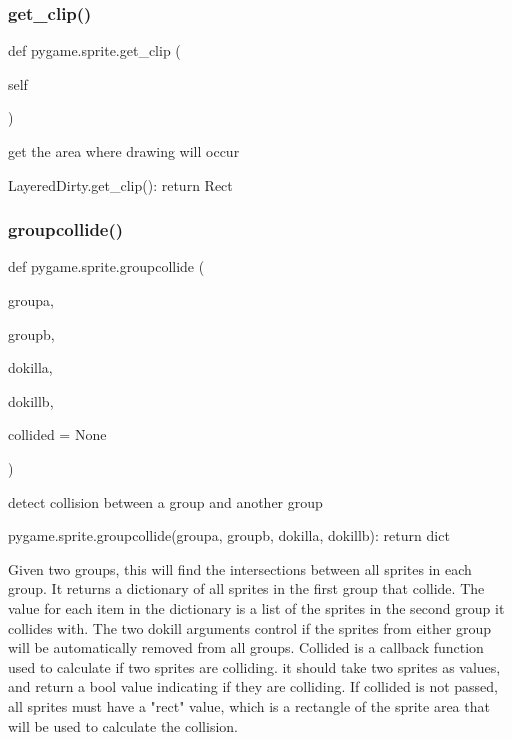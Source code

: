 \subsubsection{\texorpdfstring{get\+\_\+clip()}{get\_clip()}}
{\footnotesize\ttfamily def pygame.\+sprite.\+get\+\_\+clip (\begin{DoxyParamCaption}\item[{}]{self }\end{DoxyParamCaption})}

\begin{DoxyVerb}get the area where drawing will occur

LayeredDirty.get_clip(): return Rect\end{DoxyVerb}
 \mbox{\label{namespacepygame_1_1sprite_aa6cf4fd668b1d579f5d1385739e52851}} 
\subsubsection{\texorpdfstring{groupcollide()}{groupcollide()}}
{\footnotesize\ttfamily def pygame.\+sprite.\+groupcollide (\begin{DoxyParamCaption}\item[{}]{groupa,  }\item[{}]{groupb,  }\item[{}]{dokilla,  }\item[{}]{dokillb,  }\item[{}]{collided = {\ttfamily None} }\end{DoxyParamCaption})}

\begin{DoxyVerb}detect collision between a group and another group

pygame.sprite.groupcollide(groupa, groupb, dokilla, dokillb):
    return dict

Given two groups, this will find the intersections between all sprites in
each group. It returns a dictionary of all sprites in the first group that
collide. The value for each item in the dictionary is a list of the sprites
in the second group it collides with. The two dokill arguments control if
the sprites from either group will be automatically removed from all
groups. Collided is a callback function used to calculate if two sprites
are colliding. it should take two sprites as values, and return a bool
value indicating if they are colliding. If collided is not passed, all
sprites must have a "rect" value, which is a rectangle of the sprite area
that will be used to calculate the collision.\end{DoxyVerb}
 \mbox{\label{namespacepygame_1_1sprite_af63faa0befe41ad5ed3c2c970a735275}} 
